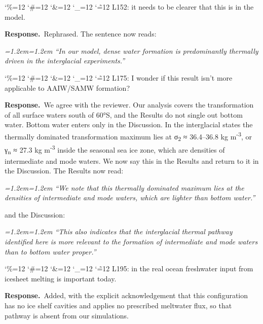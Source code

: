 \documentclass[11pt,a4paper]{article}
\newcommand{\comment}[1]{\par\medskip\noindent\color{black}\begingroup\catcode`\%=12 \catcode`\#=12 \catcode`\&=12 \catcode`\_=12 \catcode`\~=12 \commentbody}
\newcommand{\commentbody}[1]{#1\endgroup\par\smallskip}
\newcommand{\response}{\par\noindent\color{chgcol}\textbf{Response.}\ }
\newenvironment{change}{\par\smallskip\color{chgcol}\small\itshape\leftskip=1.2em\rightskip=1.2em\noindent\ignorespaces}{\par\smallskip}
\begin{document}
\comment{R3}{L152: it needs to be clearer that this is in the model.}

\response Rephrased. The sentence now reads:

\begin{change}
``In our model, dense water formation is predominantly thermally driven in the interglacial experiments.''
\end{change}


\comment{R3}{L175: I wonder if this result isn't more applicable to AAIW/SAMW formation?}


\response  We agree with the reviewer. Our analysis covers the transformation of all surface waters south of 60°S, and the Results do not single out bottom water. Bottom water enters only in the Discussion. In the interglacial states the thermally dominated transformation maximum lies at σ\textsubscript{2} ≈ 36.4--36.8 kg m\textsuperscript{-3}, or γ\textsubscript{n} ≈ 27.3 kg m\textsuperscript{-3} inside the seasonal sea ice zone, which are densities of intermediate and mode waters. We now say this in the Results and return to it in the Discussion. The Results now read:

\begin{change}
``We note that this thermally dominated maximum lies at the densities of intermediate and mode waters, which are lighter than bottom water.''
\end{change}

and the Discussion:

\begin{change}
``This also indicates that the interglacial thermal pathway identified here is more relevant to the formation of intermediate and mode waters than to bottom water proper.''
\end{change}

\comment{R3}{L195: in the real ocean freshwater input from icesheet melting is important today.}

\response Added, with the explicit acknowledgement that this configuration has no ice shelf cavities and applies no prescribed meltwater flux, so that pathway is absent from our simulations.
\end{document}

